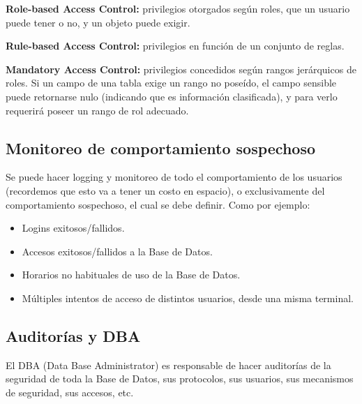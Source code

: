 \textbf{Role-based Access Control:} privilegios otorgados según roles, que un usuario puede tener o no, y un objeto puede  exigir.

\textbf{Rule-based Access Control:} privilegios en función de un conjunto de reglas.

\textbf{Mandatory Access Control:} privilegios concedidos según rangos jerárquicos de roles. Si un campo de una tabla exige un rango no poseído, el campo sensible puede retornarse nulo (indicando que es información clasificada), y para verlo requerirá poseer un rango de rol adecuado.

\subsection*{Monitoreo de comportamiento sospechoso}

Se puede hacer logging y monitoreo de todo el comportamiento de los usuarios (recordemos que esto va a tener un costo en espacio), o exclusivamente del comportamiento sospechoso, el cual se debe definir. Como por ejemplo:
\begin{itemize}
    \item Logins exitosos/fallidos.
    \item Accesos exitosos/fallidos a la Base de Datos.
    \item Horarios no habituales de uso de la Base de Datos.
    \item Múltiples intentos de acceso de distintos usuarios, desde una misma terminal.
\end{itemize}

\subsection*{Auditorías y DBA}

El DBA (Data Base Administrator) es responsable de hacer auditorías de la seguridad de toda la Base de Datos, sus protocolos, sus usuarios, sus mecanismos de seguridad, sus accesos, etc.